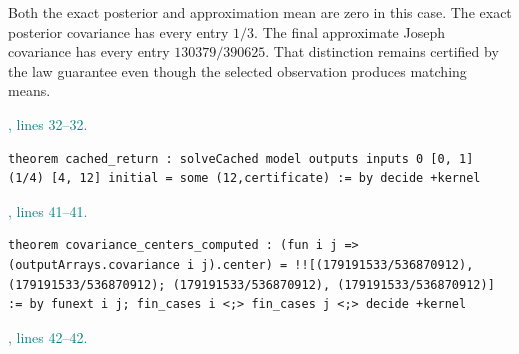 \documentclass[11pt]{article}\usepackage{needspace}\renewcommand{\paperkind}{Lean companion}\setlength{\parskip}{0.35em}
\begin{document}
Both the exact posterior and approximation mean are zero in this case. The exact posterior covariance has every entry $1/3$. The final approximate Joseph covariance has every entry $130379/390625$. That distinction remains certified by the law guarantee even though the selected observation produces matching means.



{\small\textcolor{teal}{, lines 32--32.}\par}

\begin{lstlisting}[style=BayesSource]
theorem cached_return : solveCached model outputs inputs 0 [0, 1] (1/4) [4, 12] initial = some (12,certificate) := by decide +kernel
\end{lstlisting}



{\small\textcolor{teal}{, lines 41--41.}\par}

\begin{lstlisting}[style=BayesSource]
theorem covariance_centers_computed : (fun i j => (outputArrays.covariance i j).center) = !![(179191533/536870912), (179191533/536870912); (179191533/536870912), (179191533/536870912)] := by funext i j; fin_cases i <;> fin_cases j <;> decide +kernel
\end{lstlisting}



{\small\textcolor{teal}{, lines 42--42.}\par}
\end{document}
